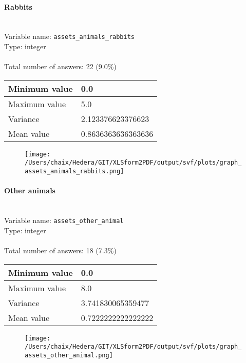 \documentclass[11.5pt, a4paper]{scrartcl}
\begin{document}
\paragraph{Rabbits}
\  \\Variable name: \texttt{assets\_animals\_rabbits}\\
Type: integer\\
\\Total number of answers: 22 (9.0\%)
\\[0.2em] \begin{tabular}{p{4cm}|p{8cm}}
Minimum value &0.0 \\
\hline
\cellcolor{mygray} Maximum value & \cellcolor{mygray}5.0 \\
\hline
Variance &2.123376623376623 \\
\hline
\cellcolor{mygray} Mean value & \cellcolor{mygray}0.8636363636363636 \\
\hline
\end{tabular}
\begin{figure}[H]
\centering
\texttt{[image: /Users/chaix/Hedera/GIT/XLSform2PDF/output/svf/plots/graph\_assets\_animals\_rabbits.png]}
\end{figure}
\paragraph{Other animals}
\  \\Variable name: \texttt{assets\_other\_animal}\\
Type: integer\\
\\Total number of answers: 18 (7.3\%)
\\[0.2em] \begin{tabular}{p{4cm}|p{8cm}}
Minimum value &0.0 \\
\hline
\cellcolor{mygray} Maximum value & \cellcolor{mygray}8.0 \\
\hline
Variance &3.741830065359477 \\
\hline
\cellcolor{mygray} Mean value & \cellcolor{mygray}0.7222222222222222 \\
\hline
\end{tabular}
\begin{figure}[H]
\centering
\texttt{[image: /Users/chaix/Hedera/GIT/XLSform2PDF/output/svf/plots/graph\_assets\_other\_animal.png]}
\end{figure}
\end{document}
